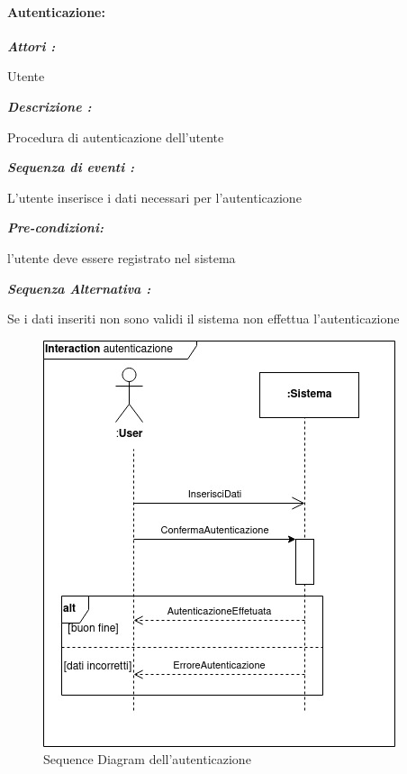\documentclass{article}
\begin{document}
\paragraph{Autenticazione:}
\begin{mdframed}

	\noindent\textit{\textbf{Attori :}}


	Utente

	\noindent\textit{\textbf{Descrizione :}}


	Procedura di autenticazione dell'utente

	\noindent\textit{\textbf{Sequenza di eventi :}}


	L’utente inserisce i dati necessari per l'autenticazione

	\noindent\textit{\textbf{Pre-condizioni:}}


	l'utente deve essere registrato nel sistema

	\noindent\textit{\textbf{Sequenza Alternativa :}}


	Se i dati inseriti non sono validi il sistema non effettua
	l'autenticazione

\end{mdframed}

\begin{figure}[h!]
	\centering
	\includegraphics[width=\textwidth]{SDautenticazione.jpg}
	\caption{Sequence Diagram dell'autenticazione}
	\label{fig:SDautenticazione}
\end{figure}
\end{document}
